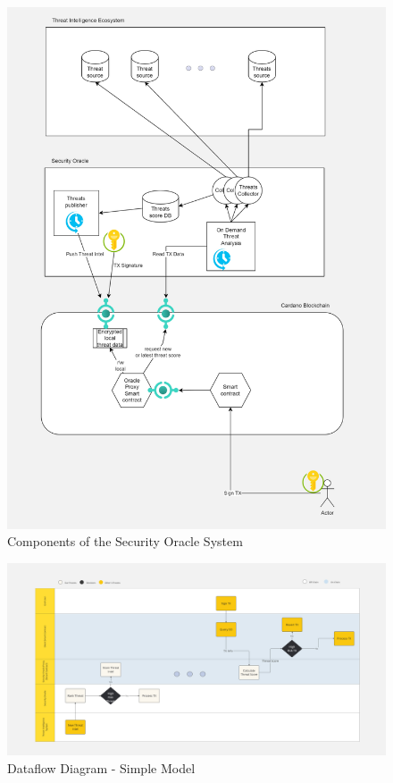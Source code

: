 \documentclass{scrreport}
\begin{document}
\begin{figure}[H]
\centering
\includegraphics[width=\textwidth]{Images/ComponentsDiagram.jpg}
\caption{Components of the Security Oracle System}
\label{fig:components_diagram}
\end{figure}

\begin{figure}[H]
\centering
\includegraphics[width=\textwidth]{Images/DataflowDiagramSimple.jpg}
\caption{Dataflow Diagram - Simple Model}
\label{fig:dataflow_simple_diagram}
\end{figure}
\end{document}
